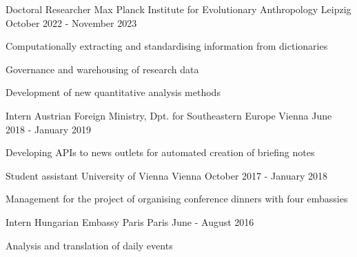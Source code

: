 \begin{cventries}

  \cventry
    {Doctoral Researcher} %
    {Max Planck Institute for Evolutionary Anthropology} %
    {Leipzig} %
    {October 2022 - November 2023} %
    {
      \begin{cvitems} %
      \item{Computationally extracting and standardising information from dictionaries}
      \item{Governance and warehousing of research data}
      \item{Development of new quantitative analysis methods}
      \end{cvitems}
    }
    
  \cventry
    {Intern} %
    {Austrian Foreign Ministry, Dpt. for Southeastern Europe} %
    {Vienna} %
    {June 2018 - January 2019} %
    {
      \begin{cvitems} %
        \item{Developing APIs to news outlets for automated creation of briefing notes}
      \end{cvitems}
    }

  \cventry
    {Student assistant} %
    {University of Vienna} %
    {Vienna} %
    {October 2017 - January 2018} %
    {
    \begin{cvitems}
    \item{Management for the project of organising conference dinners with four embassies}
    \end{cvitems}
    }
    
  \cventry
    {Intern} %
    {Hungarian Embassy Paris} %
    {Paris} %
    {June - August 2016} %
    {
    \begin{cvitems}
    \item{Analysis and translation of daily events}
    \end{cvitems}
    }
    
\end{cventries}

